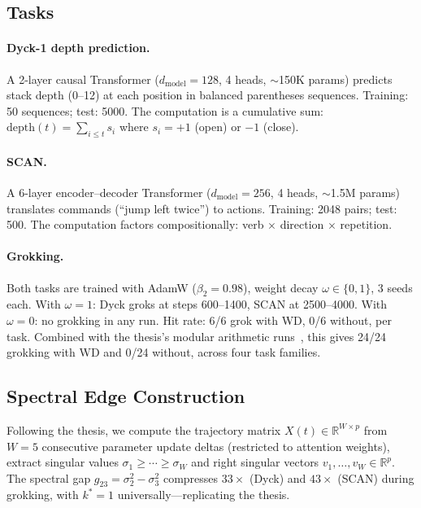 \documentclass[11pt]{article}
\newcommand{\R}{\mathbb{R}}
\begin{document}
\subsection{Tasks}

\paragraph{Dyck-1 depth prediction.}
A 2-layer causal Transformer ($d_\text{model} = 128$, 4 heads, ${\sim}$150K params) predicts stack depth (0--12) at each position in balanced parentheses sequences.
Training: 50 sequences; test: 5000.
The computation is a cumulative sum: $\text{depth}(t) = \sum_{i \leq t} s_i$ where $s_i = +1$ (open) or $-1$ (close).

\paragraph{SCAN.}
A 6-layer encoder--decoder Transformer ($d_\text{model} = 256$, 4 heads, ${\sim}$1.5M params) translates commands (``jump left twice'') to actions.
Training: 2048 pairs; test: 500.
The computation factors compositionally: verb $\times$ direction $\times$ repetition.

\paragraph{Grokking.}
Both tasks are trained with AdamW ($\beta_2 = 0.98$), weight decay $\omega \in \{0, 1\}$, 3 seeds each.
With $\omega = 1$: Dyck groks at steps 600--1400, SCAN at 2500--4000.
With $\omega = 0$: no grokking in any run.
Hit rate: 6/6 grok with WD, 0/6 without, per task.
Combined with the thesis's modular arithmetic runs~\citep{xu2026spectral_edge}, this gives 24/24 grokking with WD and 0/24 without, across four task families.


\subsection{Spectral Edge Construction}

Following the thesis, we compute the trajectory matrix $X(t) \in \R^{W \times p}$ from $W = 5$ consecutive parameter update deltas (restricted to attention weights), extract singular values $\sigma_1 \geq \cdots \geq \sigma_W$ and right singular vectors $v_1, \ldots, v_W \in \R^p$.
The spectral gap $g_{23} = \sigma_2^2 - \sigma_3^2$ compresses $33\times$ (Dyck) and $43\times$ (SCAN) during grokking, with $k^* = 1$ universally---replicating the thesis.
\end{document}
